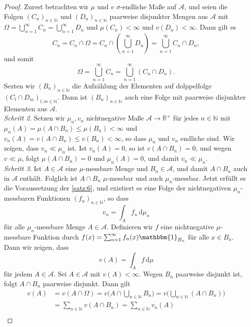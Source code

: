 \documentclass[/Users/zhangwusheng/Documents/satz von radon nikodym/satz von radon nikodym.tex]{subfiles}
\begin{document}
\begin{proof}
        Zurest betrachten wir $\mu$ und $v$ $\sigma$-endliche Maße auf $\mathcal{A}$, und seien die Folgen $(C_n)_{n \in \mathbb{N}}$ und $(D_n)_{n \in \mathbb{N}}$ paarweise disjunkter Mengen aus $\mathcal{A}$ mit 
        $\Omega = \bigcup_{n=1}^\infty C_n = \bigcup_{n=1}^\infty D_n$ und $\mu(C_n) < \infty$ und $v(D_n) < \infty$. Dann gilt es  
        \[C_n = C_n \cap \Omega = C_n \cap (\bigcup_{n=1}^\infty D_n) = \bigcup_{n=1}^\infty C_n \cap D_n,\]
        und somit 
        \[\Omega = \bigcup_{n=1}^\infty C_n = \bigcup_{n=1}^\infty (C_n \cap D_n).\]
        Sezten wir $(B_n)_{n \in \mathbb{N}}$ die Aufzählung der Elementen auf dolppelfolge $(C_l \cap D_m)_{l, m \in \mathbb{N}}$. Dann ist $(B_n)_{n \in \mathbb{N}}$ auch eine Folge mit paarweise disjunkter Elementen aus $\mathcal{A}$.\\
        \textit{Schritt 2}. Setzen wir $\mu_n, v_n$ nichtnegative Maße $\mathcal{A} \rightarrow \mathbb{R}^{+}$ für jedes $n \in \mathbb{N}$ mit $\mu_n(A) = \mu(A \cap B_n) \leq \mu(B_n) < \infty$ und $v_n(A) = v(A \cap B_n) \leq v(B_n) < \infty$, so dass $\mu_n$ und $v_n$ endliche sind.
        Wir zeigen, dass $v_n \ll \mu_n$ ist. Ist $v_n(A) =0$, so ist $v(A \cap B_n) =0$, und wegen $v \ll \mu$, folgt $\mu(A \cap B_n) =0$ und $\mu_n(A)=0$, und damit $v_n \ll \mu_n$.\\
        \textit{Schritt 3}. Ist $A \in \mathcal{A}$ eine $\mu$-messbare Menge und $B_n \in \mathcal{A}$, und damit $A \cap B_n$ auch in $\mathcal{A}$ enthält. Folglich ist $A \cap B_n$ $\mu$-messbar und auch $\mu_n$-messbar.
        Jetzt erfüllt es die Voraussetzung der \cref{satz:6}, und existiert es eine Folge der nichtnegativen $\mu_n$-messbaren Funktionen $(f_n)_{n \in \mathbb{N}}$, so dass 
        \[v_n = \int_A f_n\,\mathrm{d}\mu_n\]
        für alle $\mu_n$-messbare Menge $A \in \mathcal{A}$. Definieren wir $f$ eine nichtnegative $\mu$-messbare Funktion durch $f(x) = \sum_{n=1}^\infty f_n(x)\mathbbm{1}_{B_n}$ für alle $x \in B_n$. Dann wir zeigen, dass 
        \[v(A) = \int_A f\,\mathrm{d}\mu\]
        für jedem $A \in \mathcal{A}$. Sei $A \in \mathcal{A}$ mit $v(A) < \infty$. Wegen $B_n$ paarweise disjunkt ist, folgt $A \cap B_n$ paarweise disjunkt. Dann gilt 
        \begin{align*}
            v(A) &= v(A \cap \Omega)= v\bigl(A \cap \bigcup_{n \in \mathbb{N}} B_n \bigr) = v\bigl(\bigcup_{n \in \mathbb{N}} (A \cap B_n)\bigr)\\
            &= \sum_{n \in \mathbb{N}} v(A \cap B_n) = \sum_{n \in \mathbb{N}} v_n(A)\\

\end{align*}
\end{proof}
\end{document}
